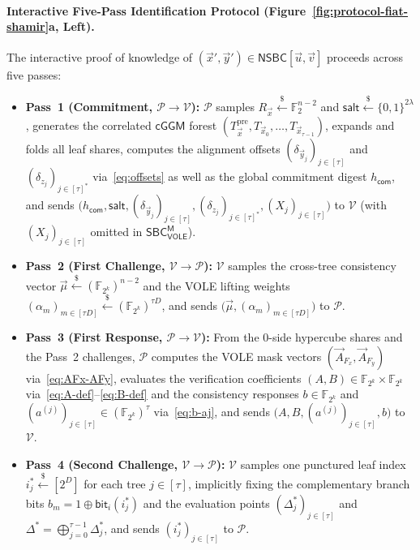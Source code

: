 \documentclass[11pt,a4paper]{article}
\theoremstyle{definition}
\theoremstyle{remark}
\newcommand{\Ftwo}{\mathbb{F}_2}
\newcommand{\Ftwok}{\mathbb{F}_{2^k}}
\newcommand{\NSBC}{\mathsf{NSBC}}
\newcommand{\SBCVOLEM}{\mathsf{SBC}_{\mathsf{VOLE}}^{\mathsf{M}}}
\newcommand{\salt}{\mathsf{salt}}
\newcommand{\com}{\mathsf{com}}
\newcommand{\cGGM}{\mathsf{cGGM}}
\begin{document}
\paragraph{Interactive Five-Pass Identification Protocol (Figure~\ref{fig:protocol-fiat-shamir}a, Left).}
The interactive proof of knowledge of $(\vec{x}', \vec{y}') \in \NSBC[\vec{u}, \vec{v}]$ proceeds across five passes:
\begin{itemize}[leftmargin=2em, itemsep=2.5pt]
    \item \textbf{Pass~1 (Commitment, $\mathcal{P} \to \mathcal{V}$):} $\mathcal{P}$ samples $R_{\vec{x}} \xleftarrow{\$} \Ftwo^{n-2}$ and $\salt \xleftarrow{\$} \{0,1\}^{2\lambda}$, generates the correlated $\cGGM$ forest $(T_{\vec{x}}^{\text{pre}}, T_{\vec{x}_0}, \dots, T_{\vec{x}_{\tau-1}})$, expands and folds all leaf shares, computes the alignment offsets $(\delta_{\vec{y}_j})_{j \in [\tau]}$ and $(\delta_{z_j})_{j \in [\tau]^*}$ via~\eqref{eq:offsets} as well as the global commitment digest $h_{\com}$, and sends $\big(h_{\com}, \salt, (\delta_{\vec{y}_j})_{j \in [\tau]}, (\delta_{z_j})_{j \in [\tau]^*}, (X_j)_{j \in [\tau]}\big)$ to $\mathcal{V}$ (with $(X_j)_{j \in [\tau]}$ omitted in $\SBCVOLEM$).
    \item \textbf{Pass~2 (First Challenge, $\mathcal{V} \to \mathcal{P}$):} $\mathcal{V}$ samples the cross-tree consistency vector $\vec{\mu} \xleftarrow{\$} (\Ftwok)^{n-2}$ and the VOLE lifting weights $(\alpha_m)_{m \in [\tau D]} \xleftarrow{\$} (\Ftwok)^{\tau D}$, and sends $\big(\vec{\mu}, (\alpha_m)_{m \in [\tau D]}\big)$ to $\mathcal{P}$.
    \item \textbf{Pass~3 (First Response, $\mathcal{P} \to \mathcal{V}$):} From the $0$-side hypercube shares and the Pass~2 challenges, $\mathcal{P}$ computes the VOLE mask vectors $(\vec{A}_{F_x}, \vec{A}_{F_y})$ via~\eqref{eq:AFx-AFy}, evaluates the verification coefficients $(A, B) \in \Ftwok \times \Ftwok$ via~\eqref{eq:A-def}--\eqref{eq:B-def} and the consistency responses $b \in \Ftwok$ and $(a^{(j)})_{j \in [\tau]} \in (\Ftwok)^\tau$ via~\eqref{eq:b-aj}, and sends $\big(A, B, (a^{(j)})_{j \in [\tau]}, b\big)$ to $\mathcal{V}$.
    \item \textbf{Pass~4 (Second Challenge, $\mathcal{V} \to \mathcal{P}$):} $\mathcal{V}$ samples one punctured leaf index $i^*_j \xleftarrow{\$} [2^D]$ for each tree $j \in [\tau]$, implicitly fixing the complementary branch bits $b_m = 1 \oplus \mathsf{bit}_i(i^*_j)$ and the evaluation points $(\Delta^*_j)_{j \in [\tau]}$ and $\Delta^* = \bigoplus_{j=0}^{\tau-1} \Delta^*_j$, and sends $(i^*_j)_{j \in [\tau]}$ to $\mathcal{P}$.

\end{itemize}
\end{document}
